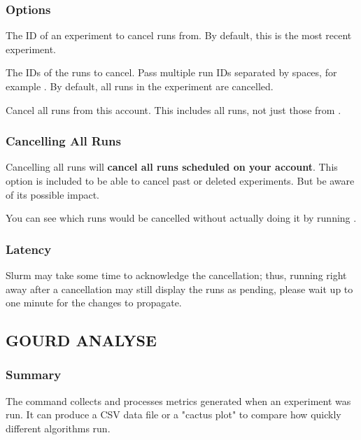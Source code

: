 \documentclass[a4paper,english]{article}
\begin{document}
\begin{adjustwidth}{18pt}{0pt}
            \subsubsection{Options}
                \begin{Description}[Options]
                  \item[\Arg{experiment-id}]
                    The ID of an experiment to cancel runs from.
                    By default, this is the most recent experiment.
                  \item[\OptArg{-i}{ run-ids}]
                    The IDs of the runs to cancel.
                    Pass multiple run IDs separated by spaces, for example .
                    By default, all runs in the experiment are cancelled.
                  \item[\Opt{-a, \ddash all}]
                    Cancel all runs from this account.
                    This includes all runs, not just those from .
                \end{Description}

            \subsubsection{Cancelling All Runs}
                Cancelling all runs will \textbf{cancel all runs scheduled on your account}.
                This option is included to be able to cancel past or deleted experiments.
                But be aware of its possible impact.

                You can see which runs would be cancelled without actually doing it
                by running    .

            \subsubsection{Latency}
                Slurm may take some time to acknowledge the cancellation; thus, running
                  right away after a cancellation may still display
                the runs as pending, please wait up to one minute for the changes to propagate.


        \subsection{GOURD ANALYSE}

            \subsubsection{Summary}
                The   command collects and processes metrics generated
                when an experiment was run. It can produce a CSV data file or a "cactus plot"
                to compare how quickly different algorithms run.


\end{adjustwidth}
\end{document}
